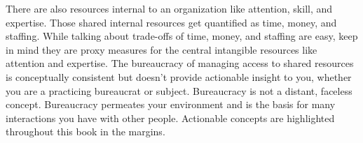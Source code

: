 There are also resources internal to an organization like attention, skill, and expertise. Those shared internal resources get quantified as time, money, and staffing. While talking about trade-offs of time, money, and staffing are easy, keep in mind they are proxy measures for the central intangible resources like attention and expertise.
The bureaucracy of managing access to shared resources is conceptually consistent but doesn't provide actionable insight to you, whether you are a practicing bureaucrat or subject. 
Bureaucracy is not a distant, faceless concept. Bureaucracy permeates your environment and is the basis for many interactions you have with other people. 
Actionable concepts are highlighted throughout this book in the margins.

